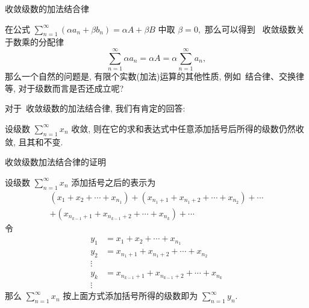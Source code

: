 
\begin{frame}{收敛级数的加法结合律}

在公式 $\sum\limits_{n=1}^\infty (\alpha a_n + \beta b_n) = \alpha A + \beta B$ 中取 $\beta = 0,$ 那么可以得到~{\color{red} 收敛级数关于数乘的分配律}
\[\sum\limits_{n=1}^\infty \alpha a_n = \alpha A = \alpha \sum\limits_{n=1}^\infty a_n,\]
那么一个自然的问题是, 有限个实数(加法)运算的其他性质, 例如~{\color{red}结合律、交换律}等, 对于级数而言是否还成立呢?

\pause
\vspace{1em}

对于~{\color{red}收敛级数}的加法结合律, 我们有肯定的回答:

\begin{thm}[数项级数的加法结合律]
设级数 $\sum\limits_{n=1}^\infty x_n$ 收敛, 则在它的求和表达式中任意添加括号后所得的级数仍然收敛, 且其和不变.
\end{thm}

\end{frame}


\begin{frame}{收敛级数加法结合律的证明}

设级数 $\sum\limits_{n=1}^\infty x_n$ 添加括号之后的表示为
\begin{multline*}
(x_1 + x_2 + \cdots + x_{n_1}) + (x_{n_1+1} + x_{n_1+2} + \cdots + x_{n_2}) + \cdots \\
+ (x_{n_{k-1}+1} + x_{n_{k-1}+2} + \cdots + x_{n_k}) + \cdots
\end{multline*}
令
\begin{align*}
y_1 & = x_1 + x_2 + \cdots + x_{n_1} \\
y_2 & = x_{n_1+1} + x_{n_1+2} + \cdots + x_{n_2} \\
\vdots \\
y_k & = x_{n_{k-1}+1} + x_{n_{k-1}+2} + \cdots + x_{n_k} \\
\vdots
\end{align*}
那么 $\sum\limits_{n=1}^\infty x_n$ 按上面方式添加括号所得的级数即为 $\sum\limits_{n=1}^\infty y_n.$

\end{frame}


